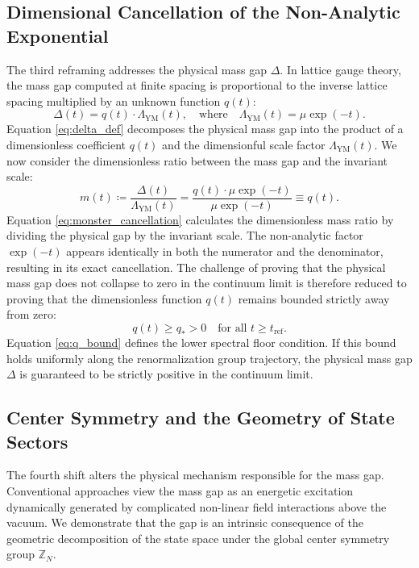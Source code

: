 \documentclass[11pt,reqno]{amsart}
\theoremstyle{plain}
\theoremstyle{definition}
\theoremstyle{remark}
\numberwithin{equation}{section}
\begin{document}
\subsection{Dimensional Cancellation of the Non-Analytic Exponential}
The third reframing addresses the physical mass gap $\Delta$. In lattice gauge theory, the mass gap computed at finite spacing is proportional to the inverse lattice spacing multiplied by an unknown function $q(t)$:
\begin{equation}
\label{eq:delta_def}
\Delta(t) = q(t) \cdot \Lambda_{\mathrm{YM}}(t), \quad \text{where} \quad \Lambda_{\mathrm{YM}}(t) = \mu \exp(-t).
\end{equation}
Equation \eqref{eq:delta_def} decomposes the physical mass gap into the product of a dimensionless coefficient $q(t)$ and the dimensionful scale factor $\Lambda_{\mathrm{YM}}(t)$. We now consider the dimensionless ratio between the mass gap and the invariant scale:
\begin{equation}
\label{eq:monster_cancellation}
m(t) \coloneqq \frac{\Delta(t)}{\Lambda_{\mathrm{YM}}(t)} = \frac{q(t) \cdot \mu \exp(-t)}{\mu \exp(-t)} \equiv q(t).
\end{equation}
Equation \eqref{eq:monster_cancellation} calculates the dimensionless mass ratio by dividing the physical gap by the invariant scale. The non-analytic factor $\exp(-t)$ appears identically in both the numerator and the denominator, resulting in its exact cancellation. The challenge of proving that the physical mass gap does not collapse to zero in the continuum limit is therefore reduced to proving that the dimensionless function $q(t)$ remains bounded strictly away from zero:
\begin{equation}
\label{eq:q_bound}
q(t) \ge q_* > 0 \quad \text{for all } t \ge t_{\mathrm{ref}}.
\end{equation}
Equation \eqref{eq:q_bound} defines the lower spectral floor condition. If this bound holds uniformly along the renormalization group trajectory, the physical mass gap $\Delta$ is guaranteed to be strictly positive in the continuum limit.

\subsection{Center Symmetry and the Geometry of State Sectors}
The fourth shift alters the physical mechanism responsible for the mass gap. Conventional approaches view the mass gap as an energetic excitation dynamically generated by complicated non-linear field interactions above the vacuum. We demonstrate that the gap is an intrinsic consequence of the geometric decomposition of the state space under the global center symmetry group $\mathbb{Z}_N$.
\end{document}
